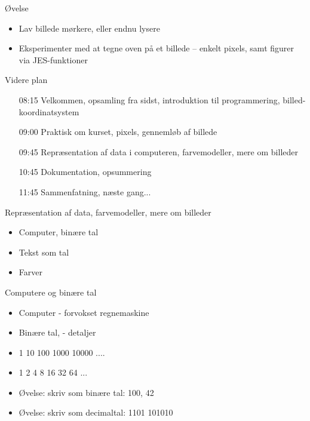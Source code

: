 \documentclass[a4paper,landscape]{slides}
\begin{document}
\begin{slide}
	\begin{center} {\large 
            Øvelse
	} \end{center}
	\begin{itemize} \addtolength{\itemsep}{-\baselineskip}
		\item Lav billede mørkere, eller endnu lysere
		\item Eksperimenter med at tegne oven på et billede
                    -- enkelt pixels, samt figurer via JES-funktioner
	\end{itemize}
\end{slide}

\begin{slide}
	\begin{center} {\large 
            Videre plan
	} \end{center}
	\begin{itemize} \addtolength{\itemsep}{-\baselineskip}
    		\item[08:15] Velkommen, opsamling fra sidst, introduktion til programmering, billed-koordinatsystem
    		\item[09:00] Praktisk om kurset, pixels, gennemløb af billede
    		\item[09:45] Repræsentation af data i computeren, farvemodeller, mere om billeder
    		\item[10:45] Dokumentation, opsummering
    		\item[11:45] Sammenfatning, næste gang...
	\end{itemize}
\end{slide}

\begin{slide}
	\begin{center} {\large 
            Repræsentation af data, farvemodeller, mere om billeder
	} \end{center}
	\begin{itemize} \addtolength{\itemsep}{-\baselineskip}
		\item Computer, binære tal
		\item Tekst som tal
		\item Farver
	\end{itemize}
\end{slide}

\begin{slide}
	\begin{center} {\large 
            Computere og binære tal
	} \end{center}
	\begin{itemize} \addtolength{\itemsep}{-\baselineskip}
		\item Computer - forvokset regnemaskine
		\item Binære tal, - detaljer
                \item 1 10 100 1000 10000 ....
                \item 1 2 4 8 16 32 64 ...
                \item Øvelse: skriv som binære tal: 100, 42
                \item Øvelse: skriv som decimaltal: 1101 101010
	\end{itemize}
\end{slide}
\end{document}

